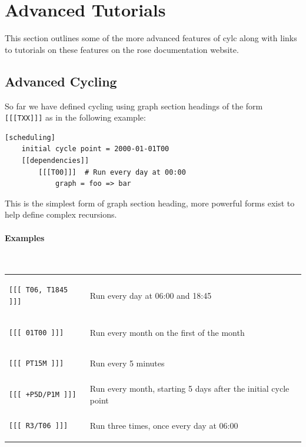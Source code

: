 \section{Advanced Tutorials}

This section outlines some of the more advanced features of cylc along with
links to tutorials on these features on the rose documentation website.


\subsection{Advanced Cycling}
\label{advanced-cycling}

So far we have defined cycling using graph section headings of the form
\lstinline{[[[TXX]]]} as in the following example:

\begin{lstlisting}
[scheduling]
    initial cycle point = 2000-01-01T00
    [[dependencies]]
        [[[T00]]]  # Run every day at 00:00
            graph = foo => bar
\end{lstlisting}

This is the simplest form of graph section heading, more powerful forms exist
to help define complex recursions.

\paragraph*{Examples} $ $

\begin{tabular}{l l}
\begin{lstlisting}
[[[ T06, T1845 ]]]
\end{lstlisting}
& Run every day at 06:00 and 18:45\\
\begin{lstlisting}
[[[ 01T00 ]]]
\end{lstlisting}
& Run every month on the first of the month \\
\begin{lstlisting}
[[[ PT15M ]]]
\end{lstlisting}
& Run every 5 minutes \\
\begin{lstlisting}
[[[ +P5D/P1M ]]]
\end{lstlisting}
& Run every month, starting 5 days after the initial cycle point \\
\begin{lstlisting}
[[[ R3/T06 ]]]
\end{lstlisting}
& Run three times, once every day at 06:00
\\
\end{tabular}

